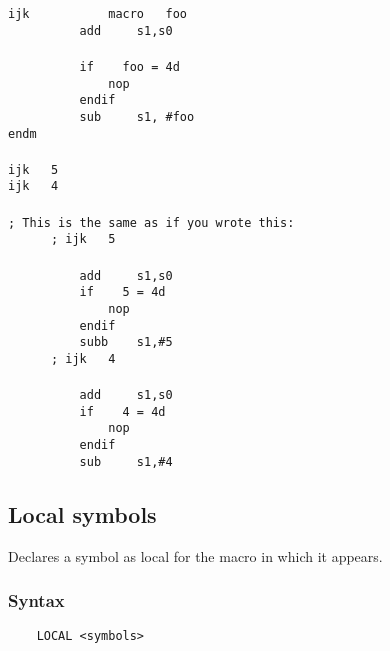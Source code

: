         \verb'ijk           macro   foo'\\
        \verb'          add     s1,s0'\\
        \verb''\\
        \verb'          if    foo = 4d'\\
        \verb'              nop'\\
        \verb'          endif'\\
        \verb'          sub     s1, #foo'\\
        \verb'endm'\\\\
        \verb'ijk   5'\\
        \verb'ijk   4'\\\\
        \verb'; This is the same as if you wrote this:'\\
        \verb'      ; ijk   5'\\\\
        \verb'          add     s1,s0'\\
        \verb'          if    5 = 4d'\\
        \verb'              nop'\\
        \verb'          endif'\\
        \verb'          subb    s1,#5'\\
        \verb'      ; ijk   4'\\\\
        \verb'          add     s1,s0'\\
        \verb'          if    4 = 4d'\\
        \verb'              nop'\\
        \verb'          endif'\\
        \verb'          sub     s1,#4'

    \subsection{Local symbols}
            Declares a symbol as local for the macro in which it appears.

            \subsubsection{Syntax}
                \verb'    LOCAL <symbols>'

